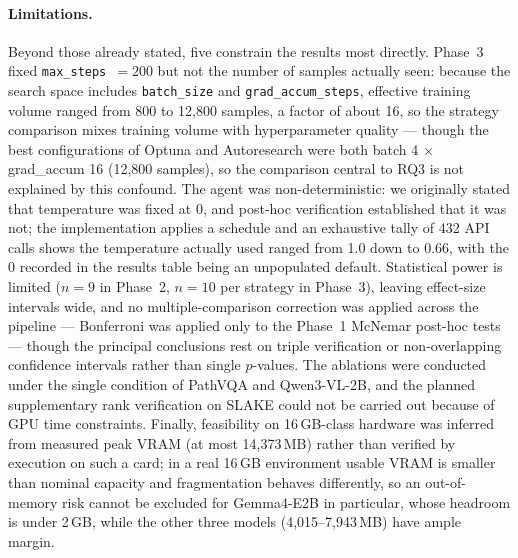 \paragraph{Limitations.}
Beyond those already stated, five constrain the results most directly. Phase~3
fixed \texttt{max\_steps}~$=200$ but not the number of samples actually seen:
because the search space includes \texttt{batch\_size} and
\texttt{grad\_accum\_steps}, effective training volume ranged from 800 to 12,800
samples, a factor of about 16, so the strategy comparison mixes training volume
with hyperparameter quality --- though the best configurations of Optuna and
Autoresearch were both batch 4 $\times$ grad\_accum 16 (12,800 samples), so the
comparison central to RQ3 is not explained by this confound. The agent was
non-deterministic: we originally stated that temperature was fixed at 0, and
post-hoc verification established that it was not; the implementation applies a
schedule and an exhaustive tally of 432 API calls shows the temperature actually
used ranged from 1.0 down to 0.66, with the 0 recorded in the results table being
an unpopulated default. Statistical power is limited ($n = 9$ in Phase~2, $n = 10$
per strategy in Phase~3), leaving effect-size intervals wide, and no
multiple-comparison correction was applied across the pipeline --- Bonferroni was
applied only to the Phase~1 McNemar post-hoc tests --- though the principal
conclusions rest on triple verification or non-overlapping confidence intervals
rather than single $p$-values. The ablations were conducted under the single
condition of PathVQA and Qwen3-VL-2B, and the planned supplementary rank
verification on SLAKE could not be carried out because of GPU time constraints.
Finally, feasibility on 16\,GB-class hardware was inferred from measured peak
VRAM (at most 14,373\,MB) rather than verified by execution on such a card; in a
real 16\,GB environment usable VRAM is smaller than nominal capacity and
fragmentation behaves differently, so an out-of-memory risk cannot be excluded
for Gemma4-E2B in particular, whose headroom is under 2\,GB, while the other
three models (4,015--7,943\,MB) have ample margin.
